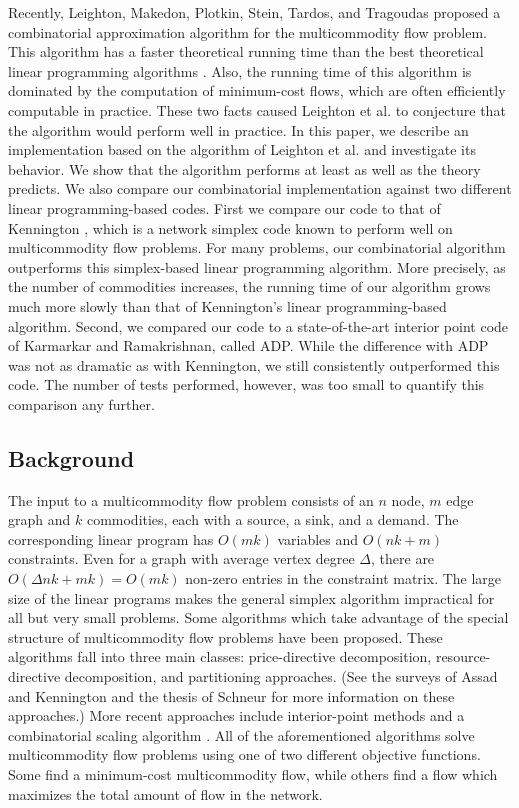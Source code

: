 Recently, Leighton, Makedon, Plotkin, Stein, Tardos, and Tragoudas
\cite{LeightonMPSTT91} proposed a combinatorial approximation algorithm 
for the multicommodity flow problem.
This algorithm has a faster theoretical running time than the
best theoretical linear programming algorithms \cite{KapoorV86,Vaidya89}.
Also, the running time of this algorithm is dominated by the computation
of minimum-cost flows, which are often efficiently computable in
practice.
These two facts caused Leighton et al. to conjecture that the algorithm
would perform well in practice.
In this paper, we describe an implementation based on the algorithm of
Leighton et al. and investigate its behavior.  
We show that the algorithm performs at least as well as the theory predicts.
We also compare our
combinatorial implementation against two different linear
programming-based codes.  First we compare our code to that
of Kennington \cite{Kennington79}, which is a network simplex code
known to perform well on multicommodity flow problems.  For many
problems, our combinatorial algorithm outperforms this
simplex-based linear
programming algorithm.  More precisely, as the number of
commodities increases, the running time of our algorithm grows much
more slowly than that of Kennington's linear programming-based
algorithm.  
Second, we compared our code to a state-of-the-art interior point code
of Karmarkar 
and Ramakrishnan, called 
ADP.  While the difference with ADP was not as
dramatic as with Kennington, we still consistently outperformed this code.
The number of tests performed, however,  was too small to quantify
this comparison any further. 

\subsection{Background}

The input to a multicommodity flow problem consists of
an $n$ node, $m$ edge graph and $k$ commodities, each with
a source, a sink, and a demand.  
The corresponding linear program has $O(mk)$ variables and 
$O(nk+m)$ constraints.  
Even for a graph with average vertex degree $\Delta$, there are
$O(\Delta n k + mk) = O(mk)$ non-zero entries in the constraint matrix.
The large size of the linear programs makes the general
simplex algorithm impractical for all but very small problems.
Some algorithms which take advantage of the special structure of
multicommodity flow problems have been proposed.  
These algorithms fall into three main classes:  price-directive decomposition, 
resource-directive decomposition, and partitioning approaches.  
(See the surveys of Assad \cite{Assad78} and Kennington \cite{Kennington78} 
and the thesis of Schneur \cite{Schneur91} for more information 
on these approaches.)
More recent approaches include interior-point methods \cite{AdlerKRV89}
and a combinatorial scaling algorithm \cite{Schneur91}.  
All of the aforementioned algorithms solve multicommodity flow problems
using one of two different objective functions.
Some find a minimum-cost multicommodity flow, while others find a flow
which maximizes the total amount of flow in the network.

